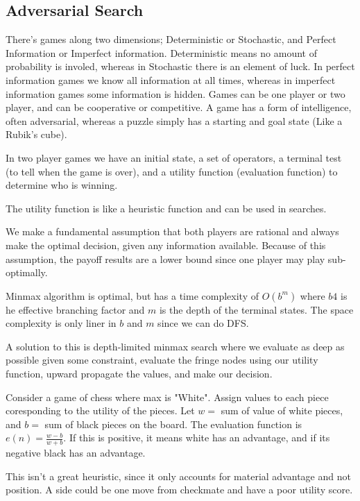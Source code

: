\documentclass{chezarticle}
\begin{document}
\subsection{Adversarial Search}
There's games along two dimensions; Deterministic or Stochastic, and Perfect Information or Imperfect information. Deterministic means no amount of probability is involed, whereas in Stochastic there is an element of luck. In perfect information games we know all information at all times, whereas in imperfect information games some information is hidden. Games can be one player or two player, and can be cooperative or competitive. A game has a form of intelligence, often adversarial, whereas a puzzle simply has a starting and goal state (Like a Rubik's cube).
\begin{definition}
In two player games we have an initial state, a set of operators, a terminal test (to tell when the game is over), and a utility function (evaluation function) to determine who is winning.
\end{definition}
The utility function is like a heuristic function and can be used in searches.
\begin{lemma}
We make a fundamental assumption that both players are rational and always make the optimal decision, given any information available. Because of this assumption, the payoff results are a lower bound since one player may play sub-optimally.
\end{lemma}
\begin{algorithm}
Minmax algorithm is optimal, but has a time complexity of $O(b^m)$ where $b4$ is he effective branching factor and $m$ is the depth of the terminal states. The space complexity is only liner in $b$ and $m$ since we can do DFS.
\end{algorithm}
A solution to this is depth-limited minmax search where we evaluate as deep as possible given some constraint, evaluate the fringe nodes using our utility function, upward propagate the values, and make our decision. 
\begin{example}
Consider a game of chess where max is "White". Assign values to each piece coresponding to the utility of the pieces. Let $w = $ sum of value of white pieces, and $b = $ sum of black pieces on the board. The evaluation function is $e(n) = \frac{w-b}{w+b}$. If this is positive, it means white has an advantage, and if its negative black has an advantage. 
\end{example}
This isn't a great heuristic, since it only accounts for material advantage and not position. A side could be one move from checkmate and have a poor utility score. 
\end{document}
